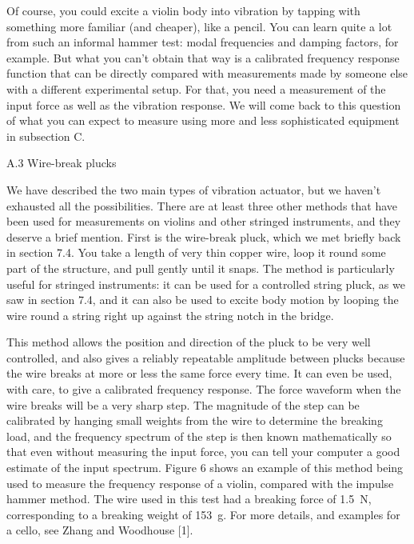   Of course, you could excite a violin body into vibration by tapping with 
  something more familiar (and cheaper), like a pencil. You can learn quite a 
  lot from such an informal hammer test: modal frequencies and damping factors, 
  for example. But what you can’t obtain that way is a calibrated frequency 
  response function that can be directly compared with measurements made by 
  someone else with a different experimental setup. For that, you need a 
  measurement of the input force as well as the vibration response. We will 
  come back to this question of what you can expect to measure using more and 
  less sophisticated equipment in subsection C. 

  A.3 Wire-break plucks 

  We have described the two main types of vibration actuator, but we haven’t 
  exhausted all the possibilities. There are at least three other methods that 
  have been used for measurements on violins and other stringed instruments, 
  and they deserve a brief mention. First is the wire-break pluck, which we met 
  briefly back in section 7.4. You take a length of very thin copper wire, loop 
  it round some part of the structure, and pull gently until it snaps. The 
  method is particularly useful for stringed instruments: it can be used for a 
  controlled string pluck, as we saw in section 7.4, and it can also be used to 
  excite body motion by looping the wire round a string right up against the 
  string notch in the bridge. 

  This method allows the position and direction of the pluck to be very well 
  controlled, and also gives a reliably repeatable amplitude between plucks 
  because the wire breaks at more or less the same force every time. It can 
  even be used, with care, to give a calibrated frequency response. The force 
  waveform when the wire breaks will be a very sharp step. The magnitude of the 
  step can be calibrated by hanging small weights from the wire to determine 
  the breaking load, and the frequency spectrum of the step is then known 
  mathematically so that even without measuring the input force, you can tell 
  your computer a good estimate of the input spectrum. Figure 6 shows an 
  example of this method being used to measure the frequency response of a 
  violin, compared with the impulse hammer method. The wire used in this test 
  had a breaking force of 1.5~N, corresponding to a breaking weight of 153~g. 
  For more details, and examples for a cello, see Zhang and Woodhouse [1]. 

